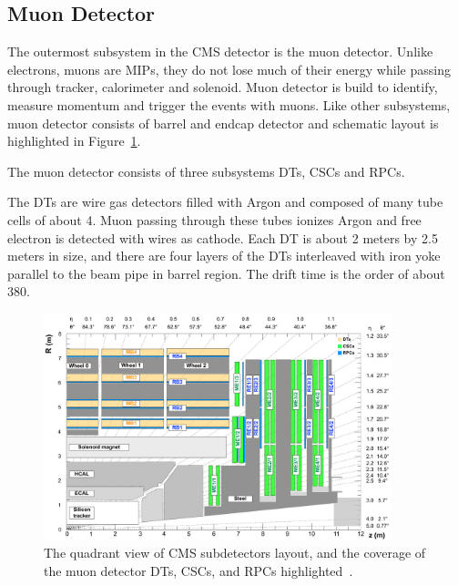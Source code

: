 \subsection{
  Muon Detector
}

The outermost subsystem in the \gls{CMS} detector is the muon detector.
Unlike electrons, muons are \glspl{MIP}, they do not lose much of their energy
while passing through tracker, calorimeter and solenoid.
Muon detector is build to identify, measure momentum and trigger the events
with muons. Like other subsystems, muon detector consists of barrel and endcap
detector and schematic layout is highlighted in Figure~\ref{fig:cms-muon-system}.

The muon detector consists of three subsystems \glspl{DT}, \glspl{CSC} and
\glspl{RPC}.

The \glspl{DT} are wire gas detectors filled with Argon and composed of
many tube cells of about 4\cm{}. Muon passing through these tubes
ionizes Argon and free electron is detected with wires as cathode.
Each DT is about 2 meters by 2.5 meters in size, and there are four layers
of the \glspl{DT} interleaved with iron yoke parallel to
the beam pipe in barrel region. The drift time is the order of about 380\nanoseconds.

\begin{figure}[!ht]
  \centering
  \includegraphics[width=0.9\textwidth]{figures/cms_muon_system.pdf}
  \caption[The quadrant view of CMS subdetectors layout, and
    the coverage of the muon detector \glspl{DT}, \glspl{CSC},
    and \glspl{RPC} highlighted]%
  {The quadrant view of CMS subdetectors layout, and
    the coverage of the muon detector \glspl{DT}, \glspl{CSC},
    and \glspl{RPC} highlighted~\cite{image-cms-muon-system}.}%
  \label{fig:cms-muon-system}
\end{figure}

